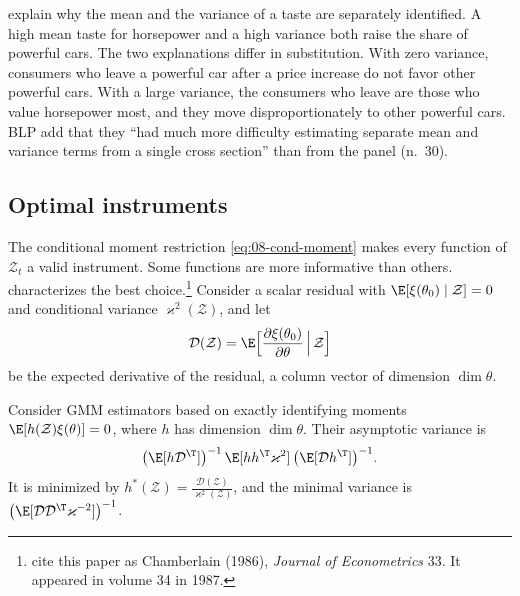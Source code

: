 \citet[p.~877]{BerryLevinsohnPakes1995} explain why the mean and the variance of a taste are separately
identified. A high mean taste for horsepower and a high variance both raise the share of powerful cars.
The two explanations differ in substitution. With zero variance, consumers who leave a powerful car after a
price increase do not favor other powerful cars. With a large variance, the consumers who leave are those who
value horsepower most, and they move disproportionately to other powerful cars. BLP add that they ``had much
more difficulty estimating separate mean and variance terms from a single cross section'' than from the panel
(n.~30).

\subsection{Optimal instruments}\label{sec:08-optiv}

The conditional moment restriction \eqref{eq:08-cond-moment} makes every function of $\mathcal{Z}_t$ a valid
instrument. Some functions are more informative than others. \citet{Chamberlain1987} characterizes the best
choice.\footnote{\citet{BerryLevinsohnPakes1995} cite this paper as Chamberlain (1986), \emph{Journal of
Econometrics} 33. It appeared in volume 34 in 1987.} Consider a scalar residual with $\E[\xi(\theta_0)
\mid \mathcal{Z}] = 0$ and conditional variance $\varkappa^2(\mathcal{Z})$, and let
\begin{equation*}
  \mathcal{D}(\mathcal{Z}) = \E\Big[\frac{\partial \xi(\theta_0)}{\partial \theta} \,\Big|\, \mathcal{Z}\Big]
\end{equation*}
be the expected derivative of the residual, a column vector of dimension $\dim\theta$.

\begin{proposition}\label{prop:08-optiv}
Consider GMM estimators based on exactly identifying moments $\E[h(\mathcal{Z})\xi(\theta)] = 0$, where
$h$ has dimension $\dim\theta$. Their asymptotic variance is
\begin{equation*}
  \big(\E[h\mathcal{D}^\T]\big)^{-1}\,\E[hh^\T\varkappa^2]\,\big(\E[\mathcal{D}h^\T]\big)^{-1}.
\end{equation*}
It is minimized by $h^*(\mathcal{Z}) = \frac{\mathcal{D}(\mathcal{Z})}{\varkappa^2(\mathcal{Z})}$, and the
minimal variance is $\big(\E[\mathcal{D}\mathcal{D}^\T\varkappa^{-2}]\big)^{-1}$.
\end{proposition}

